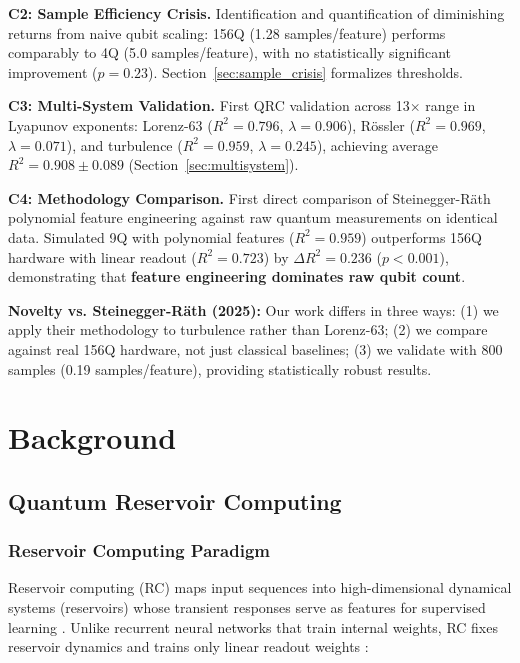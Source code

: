 \documentclass[conference]{IEEEtran}
\begin{document}
\textbf{C2: Sample Efficiency Crisis.} Identification and quantification of diminishing returns from naive qubit scaling: 156Q (1.28 samples/feature) performs comparably to 4Q (5.0 samples/feature), with no statistically significant improvement ($p=0.23$). Section~\ref{sec:sample_crisis} formalizes thresholds.

\textbf{C3: Multi-System Validation.} First QRC validation across 13$\times$ range in Lyapunov exponents: Lorenz-63 ($R^2=0.796$, $\lambda=0.906$), Rössler ($R^2=0.969$, $\lambda=0.071$), and turbulence ($R^2=0.959$, $\lambda=0.245$), achieving average $R^2=0.908 \pm 0.089$ (Section~\ref{sec:multisystem}).

\textbf{C4: Methodology Comparison.} First direct comparison of Steinegger-Räth polynomial feature engineering \cite{steinegger2025quantum} against raw quantum measurements on identical data. Simulated 9Q with polynomial features ($R^2=0.959$) outperforms 156Q hardware with linear readout ($R^2=0.723$) by $\Delta R^2=0.236$ ($p<0.001$), demonstrating that \textbf{feature engineering dominates raw qubit count}.

\textbf{Novelty vs. Steinegger-Räth (2025):} Our work differs in three ways: (1) we apply their methodology to turbulence rather than Lorenz-63; (2) we compare against real 156Q hardware, not just classical baselines; (3) we validate with 800 samples (0.19 samples/feature), providing statistically robust results.

\section{Background}

\subsection{Quantum Reservoir Computing}

\subsubsection{Reservoir Computing Paradigm}

Reservoir computing (RC) maps input sequences into high-dimensional dynamical systems (reservoirs) whose transient responses serve as features for supervised learning \cite{jaeger2001echo, maass2002real, larger2017high}. Unlike recurrent neural networks that train internal weights, RC fixes reservoir dynamics and trains only linear readout weights \cite{tanaka2019recent}:
\end{document}
